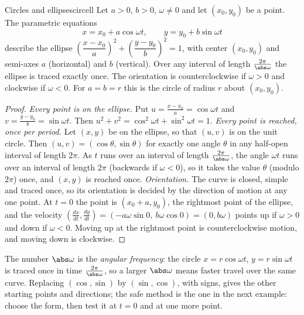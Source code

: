 \documentclass[11pt]{article}
\begin{document}
\begin{thm}{Circles and ellipses}{circell}
Let $a>0$, $b>0$, $\omega\ne0$ and let $(x_0,y_0)$ be a point. The parametric equations
\[
x=x_0+a\cos\omega t,\qquad y=y_0+b\sin\omega t
\]
describe the ellipse $\left(\dfrac{x-x_0}{a}\right)^2+\left(\dfrac{y-y_0}{b}\right)^2=1$, with center $(x_0,y_0)$ and semi-axes $a$ (horizontal) and $b$ (vertical). Over any interval of length $\frac{2\pi}{\abs\omega}$ the ellipse is traced exactly once. The orientation is counterclockwise if $\omega>0$ and clockwise if $\omega<0$. For $a=b=r$ this is the circle of radius $r$ about $(x_0,y_0)$.
\end{thm}
\begin{proof}
\emph{Every point is on the ellipse.} Put $u=\frac{x-x_0}a=\cos\omega t$ and $v=\frac{y-y_0}b=\sin\omega t$. Then $u^2+v^2=\cos^2\omega t+\sin^2\omega t=1$.
\emph{Every point is reached, once per period.} Let $(x,y)$ be on the ellipse, so that $(u,v)$ is on the unit circle. Then $(u,v)=(\cos\theta,\sin\theta)$ for exactly one angle $\theta$ in any half-open interval of length $2\pi$. As $t$ runs over an interval of length $\frac{2\pi}{\abs\omega}$, the angle $\omega t$ runs over an interval of length $2\pi$ (backwards if $\omega<0$), so it takes the value $\theta$ (modulo $2\pi$) once, and $(x,y)$ is reached once. \emph{Orientation.} The curve is closed, simple and traced once, so its orientation is decided by the direction of motion at any one point. At $t=0$ the point is $(x_0+a,y_0)$, the rightmost point of the ellipse, and the velocity $\left(\frac{dx}{dt},\frac{dy}{dt}\right)=(-a\omega\sin0,\ b\omega\cos0)=(0,b\omega)$ points up if $\omega>0$ and down if $\omega<0$. Moving up at the rightmost point is counterclockwise motion, and moving down is clockwise.
\end{proof}

The number $\abs\omega$ is the \emph{angular frequency}: the circle $x=r\cos\omega t$, $y=r\sin\omega t$ is traced once in time $\frac{2\pi}{\abs\omega}$, so a larger $\abs\omega$ means faster travel over the same curve. Replacing $(\cos,\sin)$ by $(\sin,\cos)$, with signs, gives the other starting points and directions; the safe method is the one in the next example: choose the form, then test it at $t=0$ and at one more point.
\end{document}
